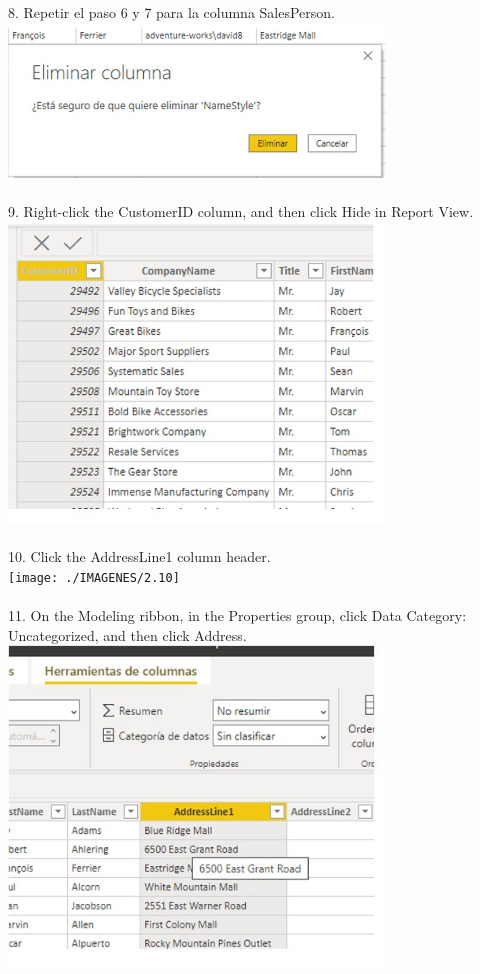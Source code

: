 \documentclass[preprint,12pt]{elsarticle}
\begin{document}
\begin{itemize}
		 		\\ 8. Repetir el paso 6 y 7 para la columna SalesPerson.
		 		\\ \includegraphics[width=10cm]{./IMAGENES/2.7} \\
		 		\\ 9. Right-click the CustomerID column, and then click Hide in Report View.
		 		\\ \includegraphics[width=10cm]{./IMAGENES/2.9} \\
		 		\\ 10. Click the AddressLine1 column header.
		 		\\ \texttt{[image: ./IMAGENES/2.10]} \\
		 		\\ 11. On the Modeling ribbon, in the Properties group, click Data Category: Uncategorized, and then click
		 		Address.
		 		\\ \includegraphics[width=10cm]{./IMAGENES/2.11} \\

\end{itemize}
\end{document}
